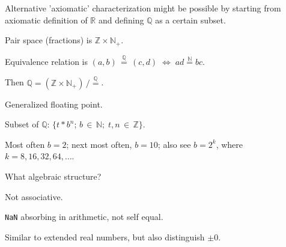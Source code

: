 \label{sec:Q_subset_of_R}

Alternative 'axiomatic' characterization
might be possible by starting from axiomatic definition of
$\mathbb{R}$ and defining $\mathbb{Q}$ as a certain subset.
\label{sec:Equivalence_classes_of_integer_pairs}

Pair space (fractions) is $\mathbb{Z} \times \mathbb{N}_{+}$.

Equivalence relation is 
$(a,b) \, \overset{\mathbb{Q}}{=} \, (c,d) 
\; \Leftrightarrow \; 
ad \overset{\mathbb{N}}{=} bc$.

Then 
$\mathbb{Q} = 
(\mathbb{Z} \times \mathbb{N}_{+}) 
\, / 
\overset{\mathbb{Q}}{=}$.

\label{Sec:b_adic_numbers}

Generalized floating point.

Subset of $\mathbb{Q}$:
$\{t \ast b^n$; $b\,\in\,\mathbb{N};\; t,n\,\in\,\mathbb{Z}\}$.

Most often $b=2$; 
next most often, $b=10$;
also see $b=2^k$, where $k=8,16,32,64,\ldots$.


What algebraic structure?

Not associative.

\texttt{NaN} absorbing in arithmetic, not self equal.

Similar to extended real numbers, but also distinguish $\pm 0$.




